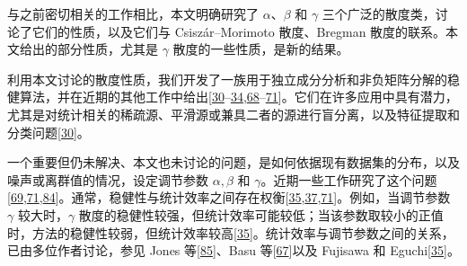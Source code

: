 与之前密切相关的工作相比，本文明确研究了 \(\alpha\)、\(\beta\) 和 \(\gamma\) 三个广泛的散度类，讨论了它们的性质，以及它们与 Csiszár–Morimoto 散度、Bregman 散度的联系。本文给出的部分性质，尤其是 \(\gamma\) 散度的一些性质，是新的结果。


利用本文讨论的散度性质，我们开发了一族用于独立成分分析和非负矩阵分解的稳健算法，并在近期的其他工作中给出[\hyperlink{B30-entropy-12-01532}{30}--\hyperlink{B34-entropy-12-01532}{34},\allowbreak \hyperlink{B68-entropy-12-01532}{68}--\hyperlink{B71-entropy-12-01532}{71}]。它们在许多应用中具有潜力，尤其是对统计相关的稀疏源、平滑源或兼具二者的源进行盲分离，以及特征提取和分类问题[\hyperlink{B30-entropy-12-01532}{30}]。


一个重要但仍未解决、本文也未讨论的问题，是如何依据现有数据集的分布，以及噪声或离群值的情况，设定调节参数 \(\alpha,\beta\) 和 \(\gamma\)。近期一些工作研究了这个问题[\hyperlink{B69-entropy-12-01532}{69},\allowbreak \hyperlink{B71-entropy-12-01532}{71},\allowbreak \hyperlink{B84-entropy-12-01532}{84}]。通常，稳健性与统计效率之间存在权衡[\hyperlink{B35-entropy-12-01532}{35},\allowbreak \hyperlink{B37-entropy-12-01532}{37},\allowbreak \hyperlink{B71-entropy-12-01532}{71}]。例如，当调节参数 \(\gamma\) 较大时，\(\gamma\) 散度的稳健性较强，但统计效率可能较低；当该参数取较小的正值时，方法的稳健性较弱，但统计效率较高[\hyperlink{B35-entropy-12-01532}{35}]。统计效率与调节参数之间的关系，已由多位作者讨论，参见 Jones 等[\hyperlink{B85-entropy-12-01532}{85}]、Basu 等[\hyperlink{B67-entropy-12-01532}{67}]以及 Fujisawa 和 Eguchi[\hyperlink{B35-entropy-12-01532}{35}]。

